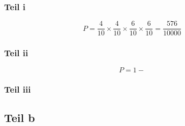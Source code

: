 \documentclass[10pt,a4paper]{article}
\begin{document}
\subsubsection{Teil i}

\begin{equation}
  P = \frac{4}{10} \times \frac{4}{10} \times \frac{6}{10} \times \frac{6}{10} = \frac{576}{10000}
\end{equation}

\subsubsection{Teil ii}

\begin{equation}
  P = 1 - 
\end{equation}

\subsubsection{Teil iii}

\subsection{Teil b}
\end{document}

